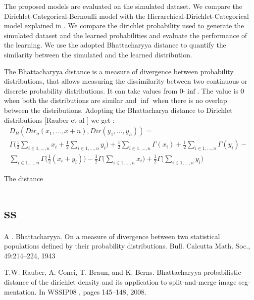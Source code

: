The proposed models are evaluated on the simulated dataset. We compare the Dirichlet-Categorical-Bernoulli model with the Hierarchical-Dirichlet-Categorical model explained in . We compare the dirichlet probability used to generate the simulated dataset and the learned probabilities and evaluate the performance of the learning. 
We use the adopted  Bhattacharyya distance  to quantify the similarity between the simulated and the learned distribution.

 The Bhattacharyya distance is a measure of divergence between
probability distributions, that allows measuring the dissimilarity between two continuous or discrete probability distributions. It can take values from 0-$\inf$. The value is 0 when both the distributions are similar and $\inf$ when there is no overlap between the distributions. Adopting the  Bhattacharya distance to Dirichlet distributions [Rauber et al ] we get :
\begin{multline}
	D_B(Dir_a(x_1, \dots ,x+n), Dir(y_1, \dots , y_n)) = \nonumber\\
	 \Gamma \Bigg( \frac{1}{2}  \sum_{i \in {1, \dots, n}} x_i +  \frac{1}{2}\sum_{i \in {1, \dots, n}} y_i\Bigg) + 
	\frac{1}{2}  \sum_{i \in {1, \dots, n}} \Gamma (x_i) + 
	\frac{1}{2}  \sum_{i \in {1, \dots, n}} \Gamma (y_i) - \\ 
	\sum_{i \in {1, \dots, n}} \Gamma \bigg(\frac{1}{2} (x_i + y_i) \bigg) - \frac{1}{2}  \Gamma \Bigg(  \sum_{i \in {1, \dots, n}} x_i \Bigg) + \frac{1}{2}  \Gamma \Bigg( \sum_{i \in {1, \dots, n}} y_i\Bigg)
\end{multline}

The distance

\section{ss}


A . Bhattacharyya.  On  a  measure  of  divergence  between two  statistical populations  defined  by  their  probability distributions.    Bull.  Calcutta Math.  Soc.,  49:214–224, 1943

T.W. Rauber, A. Conci, T. Braun, and K. Berns. Bhattacharyya probabilistic distance of the dirichlet density and its application to split-and-merge image seg- mentation. In WSSIP08 , pages 145–148, 2008. 

